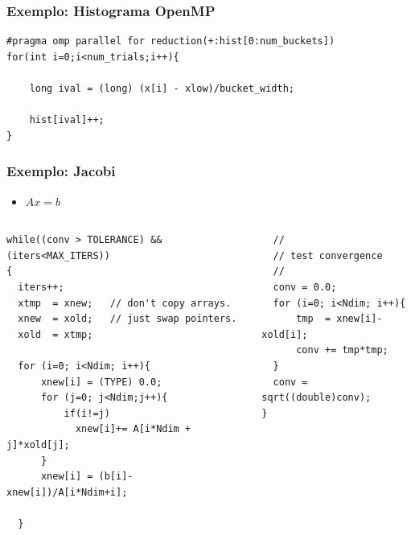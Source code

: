\documentclass[xcolor={usenames,dvipsnames},12pt,presentation,aspectratio=169]{beamer}
\begin{document}
\begin{frame}[fragile]
  \frametitle{Exemplo: Histograma OpenMP}
\begin{minipage}{0.95\textwidth}  
\begin{verbatim} 
#pragma omp parallel for reduction(+:hist[0:num_buckets])
for(int i=0;i<num_trials;i++){
    
    long ival = (long) (x[i] - xlow)/bucket_width;

    hist[ival]++; 
}
\end{verbatim}
\end{minipage}
%
\end{frame}
\begin{frame}[fragile]
  \frametitle{Exemplo: Jacobi}
  \begin{itemize}
    \item $Ax = b$
  \end{itemize}
%
\begin{columns}
  \begin{column}{0.6\textwidth} 
\begin{minipage}{0.95\textwidth}  
  \begin{verbatim} 
while((conv > TOLERANCE) && (iters<MAX_ITERS))
{
  iters++;
  xtmp  = xnew;   // don't copy arrays.
  xnew  = xold;   // just swap pointers.
  xold  = xtmp;

  for (i=0; i<Ndim; i++){
      xnew[i] = (TYPE) 0.0;
      for (j=0; j<Ndim;j++){
          if(i!=j)
            xnew[i]+= A[i*Ndim + j]*xold[j];
      }
      xnew[i] = (b[i]-xnew[i])/A[i*Ndim+i];

  }
  \end{verbatim}
  \end{minipage}    
  \end{column}
  \begin{column}{0.4\textwidth}
\begin{minipage}{0.95\textwidth}  
  \begin{verbatim} 
  //
  // test convergence    
  //
  conv = 0.0;
  for (i=0; i<Ndim; i++){
      tmp  = xnew[i]-xold[i];
      conv += tmp*tmp;
  }
  conv = sqrt((double)conv);
}
  \end{verbatim}
  \end{minipage}      
  \end{column}
\end{columns}
%
\end{frame}
\end{document}
